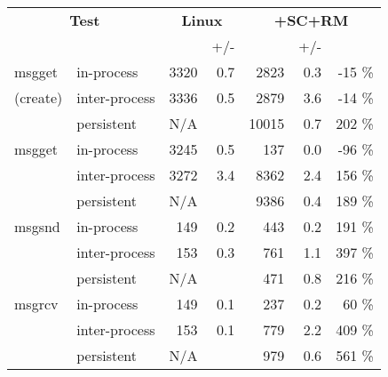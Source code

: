 \footnotesize
\centering
\begin{tabular}{|ll|rr|rrr|}
\hline
\multicolumn{2}{|c|}{{\bf Test}} &
\multicolumn{2}{c|}{{\bf Linux}} &
\multicolumn{3}{c|}{{\bf \graphene{}+SC+RM}} \\
 & & \us{} & +/- & \us{} & +/- & \\
\hline
msgget   & in-process    & 3320	& 0.7 &  2823 & 0.3 &	-15	\%		\\
(create) & inter-process & 3336	& 0.5 &  2879 & 3.6 &	-14	\%		\\
         & persistent    &  N/A	&     & 10015 & 0.7 &	202	\%      \\
\hline								
msgget   & in-process    & 3245	& 0.5 &   137 & 0.0 &	-96	\%		\\
         & inter-process & 3272	& 3.4 &  8362 & 2.4 &	156	\%		\\
         & persistent    &  N/A	&     &  9386 & 0.4 &	189	\%      \\
\hline								
msgsnd   & in-process    &  149	& 0.2 &   443 & 0.2 &	191	\%		\\
         & inter-process &  153	& 0.3 &   761 & 1.1 &	397	\%		\\
         & persistent    &  N/A	&     &   471 & 0.8 &	216	\%	    \\
\hline								
msgrcv   & in-process    &  149	& 0.1 &   237 & 0.2 &	60	\%		\\
         & inter-process &  153	& 0.1 &   779 & 2.2 &	409	\%  	\\
         & persistent    &  N/A	&     &   979 & 0.6 &	561	\%	    \\
\hline
\end{tabular}
